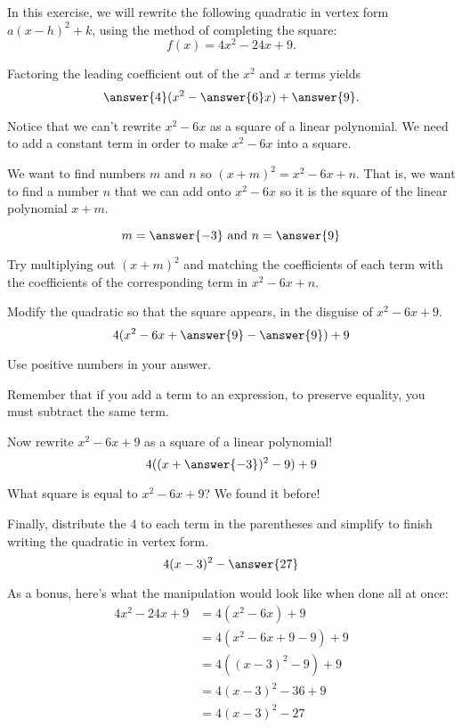 \documentclass{ximera}
\author{Kenneth Berglund}
\begin{document}
In this exercise, we will rewrite the following quadratic in vertex form $a(x - h)^2 + k$, using the method of completing the square:
\[
f(x)=4x^2-24x+9.
\]
\begin{exercise}

Factoring the leading coefficient out of the $x^2$ and $x$ terms yields
$$
\answer{4}(x^2 - \answer{6}x) + \answer{9}.
$$

\begin{exercise}
Notice that we can't rewrite $x^2 - 6x$ as a square of a linear polynomial. We need to add a constant term in order to make $x^2 - 6x$ into a square. 

We want to find numbers $m$ and $n$ so $(x + m)^2 = x^2 - 6x + n$. That is, we want to find a number $n$ that we can add onto $x^2 - 6x$ so it is the square of the linear polynomial $x + m$. 

$$
m = \answer{-3} \text{ and } n = \answer{9}
$$
\begin{hint}
Try multiplying out $(x + m)^2$ and matching the coefficients of each term with the coefficients of the corresponding term in $x^2 - 6x + n$. 
\end{hint}


\begin{exercise}
Modify the quadratic so that the square appears, in the disguise of $x^2 - 6x + 9$.
$$
4(x^2 - 6x + \answer{9} - \answer{9}) + 9
$$ 

Use positive numbers in your answer.

\begin{hint}
Remember that if you add a term to an expression, to preserve equality, you must subtract the same term.
\end{hint}

\begin{exercise}
Now rewrite $x^2 - 6x + 9$ as a square of a linear polynomial!
$$
4((x + \answer{-3})^2 - 9) + 9
$$ 
\begin{hint}
What square is equal to $x^2 - 6x + 9$? We found it before!
\end{hint}

\begin{exercise}
Finally, distribute the 4 to each term in the parentheses and simplify to finish writing the quadratic in vertex form.
$$
4(x -3)^2 - \answer{27}
$$ 

\begin{exercise}
As a bonus, here's what the manipulation would look like when done all at once:
\begin{align*}
4x^2 - 24x + 9 & = 4(x^2 - 6x) + 9 \\
& = 4(x^2 - 6x + 9 - 9) + 9 \\
& = 4((x - 3)^2 - 9) + 9 \\
& = 4(x - 3)^2 -36 + 9\\
& = 4(x - 3)^2 -27
\end{align*}
\end{exercise}
\end{exercise}
\end{exercise}
\end{exercise}
\end{exercise}
\end{exercise}
\end{document}
